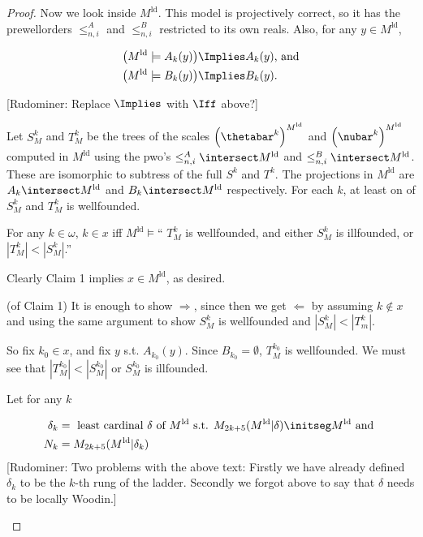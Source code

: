\documentclass[oneside,12pt]{amsart}
\begin{document}
\begin{proof}
Now we look inside $M^{\text{ld}}$. This model is projectively correct, so it
has the prewellorders $\leq^A_{n,i}$ and $\leq^B_{n,i}$ restricted to its own
reals. Also, for any $y\in M^{\text{ld}}$,

\begin{align*}
\left( M^{\text{ld}} \models A_k(y)  \right) &\Implies A_k(y) \text{, and} \\
\left( M^{\text{ld}} \models B_k(y)  \right) &\Implies B_k(y).
\end{align*}

[Rudominer: Replace $\Implies$ with $\Iff$ above?]

Let $S^k_{M}$ and $T^k_{M}$ be the trees of the scales
$\left( \thetabar^k \right)^{M^{\text{ld}}}$ and
$\left( \nubar^k \right)^{M^{\text{ld}}}$ computed in ${M^{\text{ld}}}$
using the pwo's $\leq^A_{n,i}\intersect M^{\text{ld}}$ and
$\leq^B_{n,i}\intersect M^{\text{ld}}$. These are isomorphic to subtress
of the full $S^k$ and $T^k$. The projections in $M^{\text{ld}}$ are
$A_k\intersect M^{\text{ld}}$ and
$B_k\intersect M^{\text{ld}}$ respectively. For each $k$, at least on of
$S^k_{M}$ and $T^k_{M}$ is wellfounded.

\begin{claim}[Claim 1]
For any $k\in\omega$, $k\in x$ iff $M^{\text{ld}} \models \text{`` }T^k_M$ is
wellfounded, and either $S^k_M$ is illfounded, or $|T^k_M|<|S^k_M|$.''
\end{claim}

Clearly Claim 1 implies $x\in M^{\text{ld}}$, as desired.

\begin{subproof}{(of Claim 1)}
It is enough to show $\Rightarrow$, since then we get $\Leftarrow$ by assuming
$k\notin x$ and using the same argument to show $S^k_M$ is wellfounded and
$|S^k_M| < |T^k_m|$.

So fix $k_0\in x$, and fix $y$ s.t. $A_{k_0}(y)$. Since $B_{k_0} = \emptyset$,
$T^{k_0}_M$ is wellfounded. We must see that $|T^{k_0}_M| < |S^{k_0}_M|$ or
$S^{k_0}_M$ is illfounded.

Let for any $k$

\begin{align*}
\delta_k &=  \text{ least cardinal } \delta \text{ of } M^{\text{ld}} \text{ s.t. }
    M_{2k+5}(M^{\text{ld}}|\delta) \initseg M^{\text{ld}} \text{ and } \\
N_k      &=  M_{2k+5}(M^{\text{ld}}|\delta_k)
\end{align*}
[Rudominer: Two problems with the above text: Firstly we have already defined
$\delta_k$ to be the $k$-th rung of the ladder. Secondly we forgot above to
say that $\delta$ needs to be locally Woodin.]


\end{subproof}
\end{proof}
\end{document}
